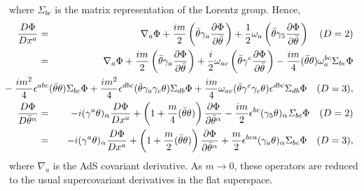 \documentclass[a4paper,12pt]{article}
\def\btheta{\bar{\theta}}
\def\dfrac#1#2{{\displaystyle\frac{#1}{#2}}}
\def\cfrac#1#2{\dfrac{\mathstrut #1}{#2}}
\begin{document}
where $\Sigma_{bc}$ is the matrix representation of the Lorentz group. Hence,
\begin{eqnarray}
 \cfrac{D\Phi}{Dx^{a}}
 &=& \nabla_{a}\Phi 
  + \cfrac{im}{2}\left(\btheta\gamma_{a}
		  \cfrac{\partial\Phi}{\partial\btheta}\right)
   +\cfrac{1}{2}\omega_{a}\left(\btheta\gamma_{5}
			   \cfrac{\partial\Phi}{\partial\btheta}\right)
	\quad (D=2) \nonumber \\
    \label{ospcvx}
 &=& \nabla_{a}\Phi 
  + \cfrac{im}{2}\left(\btheta\gamma_{a}
		  \cfrac{\partial\Phi}{\partial\btheta}\right)
   +\cfrac{i}{2}\omega_{ac}\left(\btheta\gamma^{c}
			   \cfrac{\partial\Phi}{\partial\btheta}\right)
   -\frac{im}{4}(\btheta\theta)\omega_{a}^{bc}\Sigma_{bc}\Phi 
	\\
 & & {} \hspace{-2cm}
   -\frac{im^{2}}{4}\epsilon^{abc}(\btheta\theta)\Sigma_{bc}\Phi
   +\frac{im^{2}}{4}\epsilon^{dbc}(\btheta\gamma_{a}\gamma_{c}\theta)
	\Sigma_{db}\Phi
   + \frac{im}{4}\omega_{ae}(\btheta\gamma^{e}\gamma_{c}\theta)
	\epsilon^{dbc}\Sigma_{db}\Phi \quad (D=3), \nonumber \\
 \cfrac{D\Phi}{D\btheta^{\alpha}}
  &=& -i(\gamma^{a}\theta)_{\alpha}\cfrac{D\Phi}{D x^{a}}
  + \left(1 + \cfrac{m}{4}(\btheta\theta)\right)
  \cfrac{\partial\Phi}{\partial\btheta^{\alpha}}
  -\cfrac{im}{2}\epsilon^{bc}(\gamma_{5}\theta)_{\alpha}
  \mathit{\Sigma_{bc}}\Phi \quad (D=2)\nonumber \\
  &=& -i(\gamma^{a}\theta)_{\alpha}\cfrac{D\Phi}{D x^{a}}
  + \left(1 + \cfrac{m}{2}(\btheta\theta)\right)
  \cfrac{\partial\Phi}{\partial\btheta^{\alpha}}
  +\cfrac{m}{2}\epsilon^{bca}(\gamma_{a}\theta)_{\alpha}\Sigma_{bc}\Phi
  \quad (D=3), \label{ospcvspinor}
\end{eqnarray}
where $\nabla_{a}$ is the AdS covariant derivative. 
As $m \rightarrow 0$, these operators 
are reduced to the usual supercovariant derivatives in the flat superspace.
\end{document}
